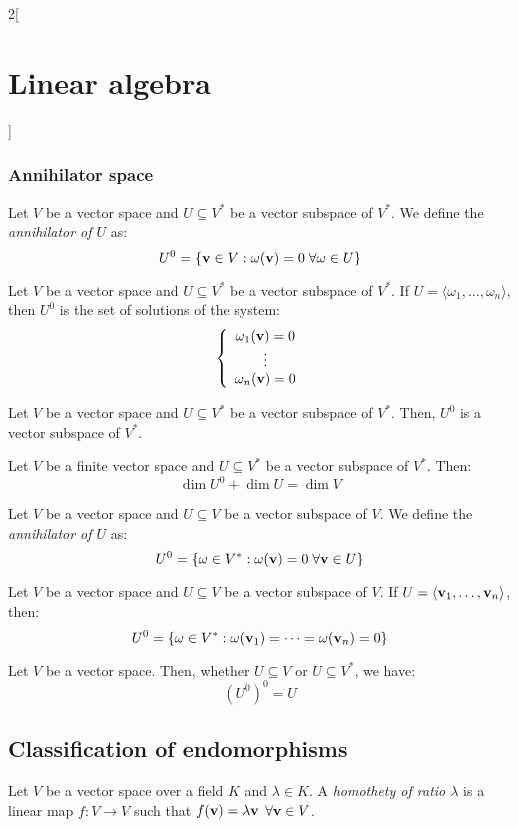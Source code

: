 \documentclass[../../../main.tex]{subfiles}
\begin{document}
\begin{multicols}{2}[\section{Linear algebra}]
  \subsubsection{Annihilator space}
  \begin{definition}
    Let $V$ be a vector space and $U\subseteq V^*$ be a vector subspace of $V^*$. We define the \textit{annihilator of $U$} as:
    $$U^0=\{\boldsymbol{\mathrm{v}}\in V:\omega(\boldsymbol{\mathrm{v}})=0\;\forall\omega\in U\}$$
  \end{definition}
  \begin{lemma}
    Let $V$ be a vector space and $U\subseteq V^*$ be a vector subspace of $V^*$. If $U=\langle\omega_1,\ldots,\omega_n\rangle$, then $U^0$ is the set of solutions of the system:
    $$\left\{
      \begin{array}{c}
        \omega_1(\boldsymbol{\mathrm{v}})=0 \\
        \vdots                         \\
        \omega_n(\boldsymbol{\mathrm{v}})=0
      \end{array}
      \right.$$
  \end{lemma}
  \begin{lemma}
    Let $V$ be a vector space and $U\subseteq V^*$ be a vector subspace of $V^*$. Then, $U^0$ is a vector subspace of $V^*$.
  \end{lemma}
  \begin{theorem}
    Let $V$ be a finite vector space and $U\subseteq V^*$ be a vector subspace of $V^*$. Then: $$\dim U^0+\dim U=\dim V$$
  \end{theorem}
  \begin{definition}
    Let $V$ be a vector space and $U\subseteq V$ be a vector subspace of $V$. We define the \textit{annihilator of $U$} as:
    $$U^0=\{\omega\in V^*:\omega(\boldsymbol{\mathrm{v}})=0\;\forall\boldsymbol{\mathrm{v}}\in U\}$$
  \end{definition}
  \begin{lemma}
    Let $V$ be a vector space and $U\subseteq V$  be a vector subspace of $V$. If $U=\langle\boldsymbol{\mathrm{v}}_1,\ldots,\boldsymbol{\mathrm{v}}_n\rangle$, then: $$U^0=\{\omega\in V^*:\omega(\boldsymbol{\mathrm{v}}_1)=\cdots=\omega(\boldsymbol{\mathrm{v}}_n)=0\}$$
  \end{lemma}
  \begin{prop}
    Let $V$ be a vector space. Then, whether $U\subseteq V$ or $U\subseteq V^*$, we have: $${(U^0)}^0=U$$
  \end{prop}
  \subsection{Classification of endomorphisms}
  \begin{definition}
    Let $V$ be a vector space over a field $K$ and $\lambda\in K$. A \textit{homothety of ratio $\lambda$} is a linear map $f:V\rightarrow V$ such that $f(\boldsymbol{\mathrm{v}})=\lambda\boldsymbol{\mathrm{v}}$ $\forall\boldsymbol{\mathrm{v}}\in V$.
  \end{definition}

\end{multicols}
\end{document}
